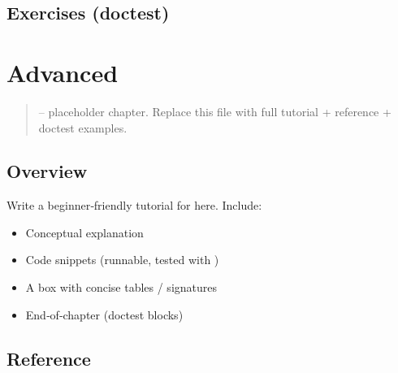 \documentclass[a4paper,11pt,english]{sphinxmanual}
\begin{document}
\subsection{Exercises (doctest)}
\label{\detokenize{concurrency/thread_safety:exercises-doctest}}
\begin{sphinxVerbatim}[commandchars=\\\{\}]
\end{sphinxVerbatim}

\sphinxstepscope


\section{Advanced}
\label{\detokenize{typing/advanced:advanced}}\label{\detokenize{typing/advanced::doc}}\begin{quote}

\sphinxAtStartPar
{} – placeholder chapter. Replace this file with full tutorial + reference + doctest examples.
\end{quote}


\subsection{Overview}
\label{\detokenize{typing/advanced:overview}}
\sphinxAtStartPar
Write a beginner‑friendly tutorial for  here. Include:
\begin{itemize}
\item {} 
\sphinxAtStartPar
Conceptual explanation

\item {} 
\sphinxAtStartPar
Code snippets (runnable, tested with )

\item {} 
\sphinxAtStartPar
A  box with concise tables / signatures

\item {} 
\sphinxAtStartPar
End‑of‑chapter  (doctest blocks)

\end{itemize}


\subsection{Reference}
\label{\detokenize{typing/advanced:reference}}
\end{document}
